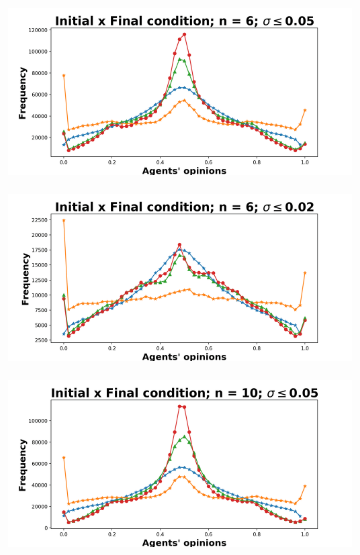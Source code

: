 \documentclass{article}
\begin{document}
\begin{figure}[H]
    \begin{subfigure}[b]{0.49\textwidth}
      \includegraphics[width=\textwidth]{img/oiks/oiks_smallsigma005_n6.png}
    \end{subfigure}
    \begin{subfigure}[b]{0.49\textwidth}
      \includegraphics[width=\textwidth]{img/oiks/oiks_smallsigma002_n6.png}
    \end{subfigure}
     \begin{subfigure}[b]{0.49\textwidth}
       \includegraphics[width=\textwidth]{img/oiks/oiks_smallsigma005_n10.png}

\end{subfigure}
\end{figure}
\end{document}
